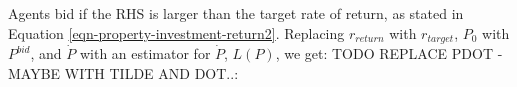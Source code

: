 






Agents bid if the RHS is larger than the target rate of return, %
as stated in Equation \ref{eqn-property-investment-return2}. %
Replacing $r_{return}$ with $r_{target}$, $P_0$ with $P^{bid}$, and $\dot P$ with an estimator for $\dot P$, $L(P)$, we get: TODO REPLACE PDOT - MAYBE WITH TILDE AND DOT..:  %

